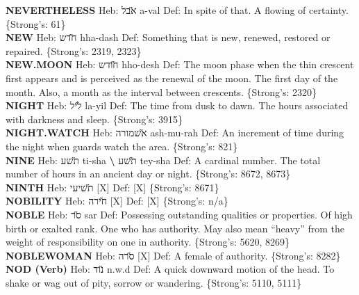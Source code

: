 {\textbf{NEVERTHELESS} Heb: {\large\H אבל} a-val Def: In spite of that. A flowing of certainty. \{Strong's: 61\}\hfill{}\\

\textbf{NEW} Heb: {\large\H חדש} hha-dash Def: Something that is new, renewed, restored or repaired. \{Strong's: 2319, 2323\}\hfill{}\\

\textbf{NEW.MOON} Heb: {\large\H חודש} hho-desh Def: The moon phase when the thin crescent first appears and is perceived as the renewal of the moon. The first day of the month. Also, a month as the interval between crescents. \{Strong's: 2320\}\hfill{}\\

\textbf{NIGHT} Heb: {\large\H ליל} la-yil Def: The time from dusk to dawn. The hours associated with darkness and sleep. \{Strong's: 3915\}\hfill{}\\

\textbf{NIGHT.WATCH} Heb: {\large\H אשמורה} ash-mu-rah Def: An increment of time during the night when guards watch the area. \{Strong's: 821\}\hfill{}\\

\textbf{NINE} Heb: {\large\H תשע} ti-sha \textbf{\textbackslash{}} {\large\H תשע} tey-sha Def: A cardinal number. The total number of hours in an ancient day or night. \{Strong's: 8672, 8673\}\hfill{}\\

\textbf{NINTH} Heb: {\large\H תשיעי} {[}X{]} Def: {[}X{]} \{Strong's: 8671\}\hfill{}\\

\textbf{NOBILITY} Heb: {\large\H חירה} {[}X{]} Def: {[}X{]} \{Strong's: n/a\}\hfill{}\\

\textbf{NOBLE} Heb: {\large\H סר} sar Def: Possessing outstanding qualities or properties. Of high birth or exalted rank. One who has authority. May also mean ``heavy'' from the weight of responsibility on one in authority. \{Strong's: 5620, 8269\}\hfill{}\\

\textbf{NOBLEWOMAN} Heb: {\large\H סרה} {[}X{]} Def: A female of authority. \{Strong's: 8282\}\hfill{}\\

\textbf{NOD (Verb)} Heb: {\large\H נוד} n.w.d Def: A quick downward motion of the head. To shake or wag out of pity, sorrow or wandering. \{Strong's: 5110, 5111\}\hfill{}\\

}
